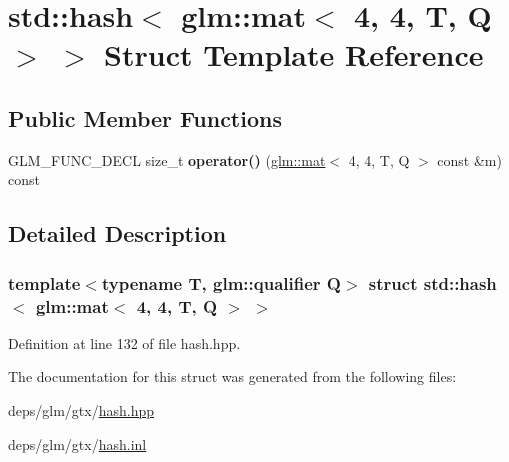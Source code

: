 \hypertarget{structstd_1_1hash_3_01glm_1_1mat_3_014_00_014_00_01T_00_01Q_01_4_01_4}{}\section{std\+:\+:hash$<$ glm\+:\+:mat$<$ 4, 4, T, Q $>$ $>$ Struct Template Reference}
\label{structstd_1_1hash_3_01glm_1_1mat_3_014_00_014_00_01T_00_01Q_01_4_01_4}
\subsection*{Public Member Functions}
\begin{DoxyCompactItemize}
\item 
\mbox{\label{structstd_1_1hash_3_01glm_1_1mat_3_014_00_014_00_01T_00_01Q_01_4_01_4_a7e0eebc761a10b1cb948a20d5d9a0eef}} 
G\+L\+M\+\_\+\+F\+U\+N\+C\+\_\+\+D\+E\+CL size\+\_\+t {\bfseries operator()} (\hyperlink{structglm_1_1mat}{glm\+::mat}$<$ 4, 4, T, Q $>$ const \&m) const
\end{DoxyCompactItemize}


\subsection{Detailed Description}
\subsubsection*{template$<$typename T, glm\+::qualifier Q$>$\newline
struct std\+::hash$<$ glm\+::mat$<$ 4, 4, T, Q $>$ $>$}



Definition at line 132 of file hash.\+hpp.



The documentation for this struct was generated from the following files\+:\begin{DoxyCompactItemize}
\item 
deps/glm/gtx/\hyperlink{hash_8hpp}{hash.\+hpp}\item 
deps/glm/gtx/\hyperlink{hash_8inl}{hash.\+inl}\end{DoxyCompactItemize}
